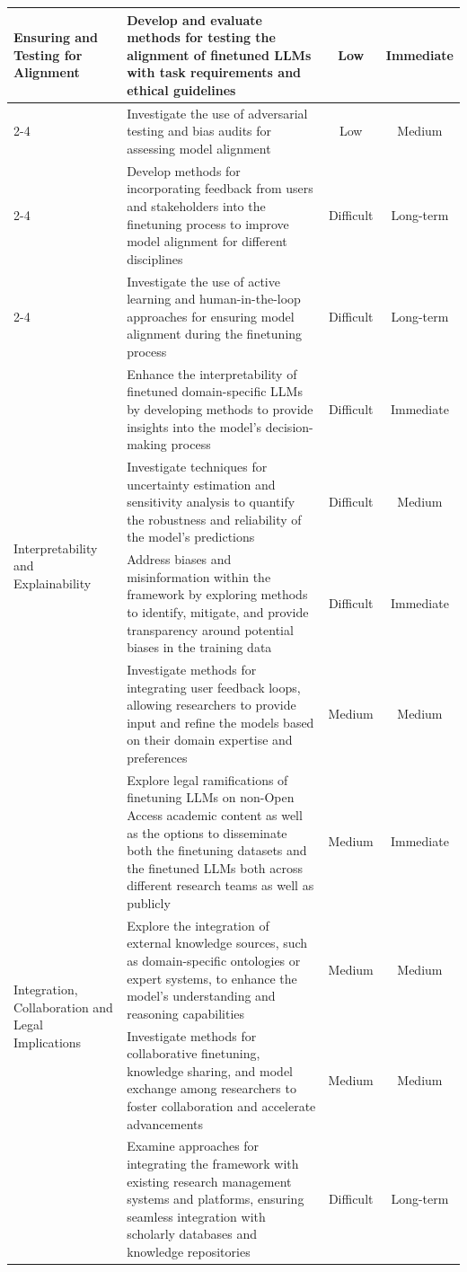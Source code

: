 \documentclass{article}
\begin{document}
{\begin{longtable}[htbp]{p{2.5cm} p{9cm} c c }
\multirow{4}{2.5cm}{\centering Ensuring and Testing for Alignment}
& Develop and evaluate methods for testing the alignment of finetuned LLMs with task requirements and ethical guidelines & Low & Immediate \\ \cline{2-4}
& Investigate the use of adversarial testing and bias audits for assessing model alignment & Low & Medium \\ \cline{2-4}
& Develop methods for incorporating feedback from users and stakeholders into the finetuning process to improve model alignment for different disciplines & Difficult & Long-term \\ \cline{2-4}
& Investigate the use of active learning and human-in-the-loop approaches for ensuring model alignment during the finetuning process & Difficult & Long-term \\ \hline


\multirow{4}{2.5cm}{\centering Interpretability and Explainability}
& Enhance the interpretability of finetuned domain-specific LLMs by developing methods to provide insights into the model's decision-making process & Difficult & Immediate \\ \cline{2-4}
& Investigate techniques for uncertainty estimation and sensitivity analysis to quantify the robustness and reliability of the model's predictions & Difficult & Medium \\ \cline{2-4}
& Address biases and misinformation within the framework by exploring methods to identify, mitigate, and provide transparency around potential biases in the training data & Difficult & Immediate \\ \cline{2-4}
& Investigate methods for integrating user feedback loops, allowing researchers to provide input and refine the models based on their domain expertise and preferences & Medium & Medium \\ \hline

\multirow{4}{2.5cm}{\centering Integration, Collaboration and Legal Implications}
& Explore legal ramifications of finetuning LLMs on non-Open Access academic content as well as the options to disseminate both the finetuning datasets and the finetuned LLMs both across different research teams as well as publicly & Medium & Immediate \\ \cline{2-4}
& Explore the integration of external knowledge sources, such as domain-specific ontologies or expert systems, to enhance the model's understanding and reasoning capabilities & Medium & Medium \\ \cline{2-4}
& Investigate methods for collaborative finetuning, knowledge sharing, and model exchange among researchers to foster collaboration and accelerate advancements & Medium & Medium \\ \cline{2-4}
& Examine approaches for integrating the framework with existing research management systems and platforms, ensuring seamless integration with scholarly databases and knowledge repositories & Difficult & Long-term \\ \hline

\end{longtable}
}
\end{document}
